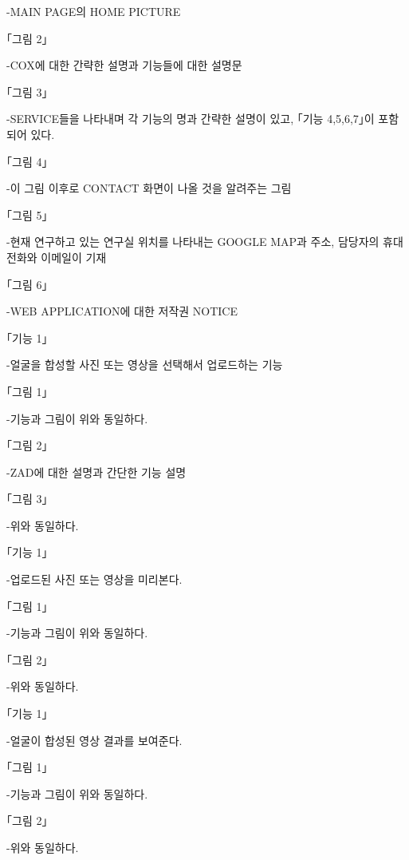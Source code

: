 \documentclass{oblivoir}
\begin{document}
-MAIN PAGE의 HOME PICTURE

｢그림 2｣

-COX에 대한 간략한 설명과 기능들에 대한 설명문

｢그림 3｣

-SERVICE들을 나타내며 각 기능의 명과 간략한 설명이 있고, ｢기능 4,5,6,7｣이 포함되어 있다.

｢그림 4｣

-이 그림 이후로 CONTACT 화면이 나올 것을 알려주는 그림

｢그림 5｣

-현재 연구하고 있는 연구실 위치를 나타내는 GOOGLE MAP과 주소, 담당자의 휴대전화와 이메일이 기재

｢그림 6｣

-WEB APPLICATION에 대한 저작권 NOTICE

\begin{figure}[h!]
    \centering
\end{figure}
｢기능 1｣

-얼굴을 합성할 사진 또는 영상을 선택해서 업로드하는 기능

｢그림 1｣

-기능과 그림이 위와 동일하다.

｢그림 2｣

-ZAD에 대한 설명과 간단한 기능 설명

｢그림 3｣

-위와 동일하다.

\begin{figure}[h!]
    \centering
\end{figure}

｢기능 1｣

-업로드된 사진 또는 영상을 미리본다.

｢그림 1｣

-기능과 그림이 위와 동일하다.

｢그림 2｣

-위와 동일하다.

\begin{figure}[h!]
    \centering
\end{figure}
｢기능 1｣

-얼굴이 합성된 영상 결과를 보여준다.

｢그림 1｣

-기능과 그림이 위와 동일하다.

｢그림 2｣

-위와 동일하다.
\end{document}
